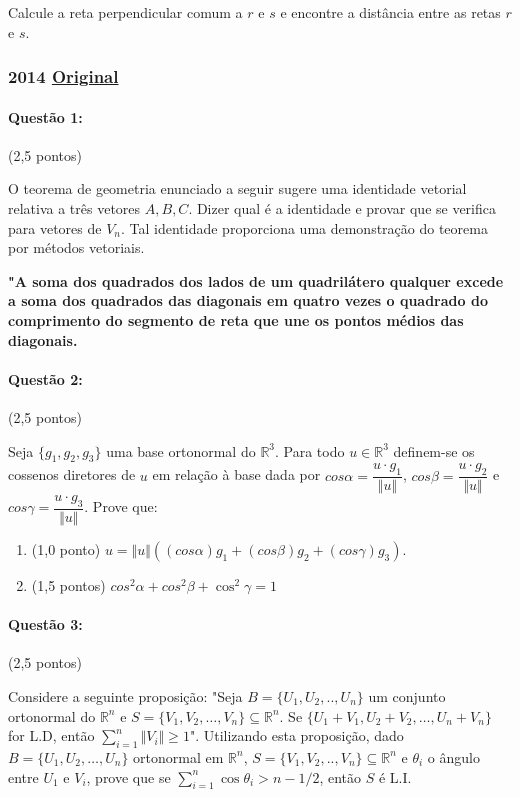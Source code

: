 \documentclass[12pt,a4paper]{article}
\newcommand{\original}[1]{\tiny \href{#1}{Original} \normalsize}
\begin{document}
Calcule a reta perpendicular comum a $r$ e $s$ e encontre a distância entre as retas $r$ e $s$. 

\newpage
\subsubsection{2014 \original{https://drive.google.com/file/d/1eGsopDShFNA7CR_LAtOUedXkkwwMM06H/view?usp=sharing}}
\paragraph{Questão 1:} (2,5 pontos) 

O teorema de geometria enunciado a seguir sugere uma identidade vetorial relativa a três vetores $A,B,C$. Dizer qual é a identidade e provar que se verifica para vetores de $V_n$. Tal identidade proporciona uma demonstração do teorema por métodos vetoriais. 
\vspace{0.3cm}

\textbf{"A soma dos quadrados dos lados de um quadrilátero qualquer excede a soma dos quadrados das diagonais em quatro vezes o quadrado do comprimento do segmento de reta que une os pontos médios das diagonais.}

\paragraph{Questão 2:} (2,5 pontos) 

Seja $\{g_1,g_2,g_3\}$ uma base ortonormal do $\mathbb{R}^3$. Para todo $u \in \mathbb{R}^3$ definem-se os cossenos diretores de $u$ em relação à base dada por $cos\alpha=\dfrac{u \cdot g_1}{\Vert u \Vert}$, $cos\beta=\dfrac{u \cdot g_2}{\Vert u \Vert}$ e $cos\gamma = \dfrac{u \cdot g_3}{\Vert u \Vert}$. Prove que:
\begin{enumerate}[label=(\alph*)]
\item (1,0 ponto) $u=\Vert u \Vert ((cos\alpha)g_1+(cos\beta)g_2+(cos\gamma)g_3)$.
\item (1,5 pontos) $cos^2\alpha +cos^2\beta +\cos^2\gamma=1$
\end{enumerate}

\paragraph{Questão 3:} (2,5 pontos) 

Considere a seguinte proposição: "Seja $B=\{U_1,U_2,..,U_n\}$ um conjunto ortonormal do $\mathbb{R}^n$ e $S=\{V_1,V_2,\dots,V_n\} \subseteq \mathbb{R}^n$. Se $\{U_1+V_1,U_2+V_2,\dots,U_n+V_n\}$ for L.D, então $\sum_{i=1}^{n}\Vert V_i \Vert \geq 1$".
Utilizando esta proposição, dado $B=\{U_1,U_2,\dots,U_n\}$ ortonormal em $\mathbb{R}^n$, $S=\{V_1,V_2,..,V_n\} \subseteq \mathbb{R}^n$ e $\theta_i$ o ângulo entre $U_1 \textrm{ e } V_i$, prove que se $\sum_{i=1}^n\cos\theta_i > n-1/2$, então $S$ é L.I.
\end{document}

